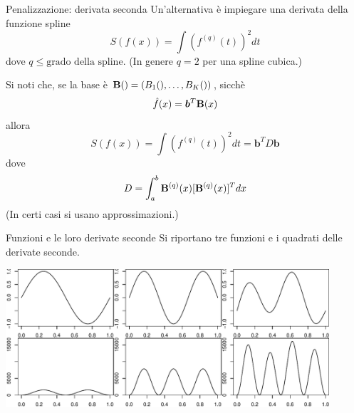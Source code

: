 \documentclass{beamer}\usepackage[]{graphicx}\usepackage[]{color}
\newenvironment{knitrout}{}{} %
\begin{document}
\begin{frame}{Penalizzazione: derivata seconda}
Un'alternativa \`e impiegare una derivata della funzione spline
\[ S(f(x)) = \int (f^{(q)}(t))^2dt \]
dove $q\leq\mbox{grado della spline}$. (In genere $q=2$ per una spline cubica.)

Si noti che, se la base \`e ${\bf B}() = (B_1(),\ldots,B_K())$, sicch\`e
\[ \hat{f}(x) = {\bm{b}}^T{\bf B}(x) \]
allora 
\[ S(f(x)) = \int (f^{(q)}(t))^2dt = {\bm{b}}^TD{\bm{b}} \]
dove
\[ D = \int_a^b  {\bf B}^{(q)}(x)[{\bf B}^{(q)}(x)]^Tdx \]
(In certi casi  si usano approssimazioni.)
\end{frame}


\begin{frame}{Funzioni e le loro derivate seconde}
Si riportano tre funzioni e i quadrati delle derivate seconde.
\begin{center}
\begin{knitrout}
\color{fgcolor}
\includegraphics[width=0.9\textwidth]{figure/020-regression-1unnamed-chunk-22-1} 

\end{knitrout}
\end{center}
\end{frame}
\end{document}
